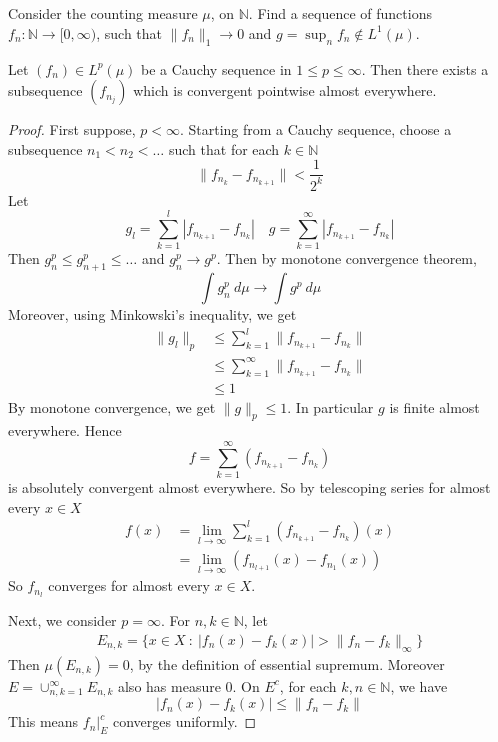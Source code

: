 
\chapter{}

\begin{remark}
  Consider the counting measure $\mu$, on $\mathbb{N}$. Find a
  sequence of functions $f_n : \mathbb{N} \to [0, \infty)$, such that
  $\|f_n\|_1 \to 0$ and $g = \sup_{n} f_n \notin L^1(\mu)$.
\end{remark}

\begin{lemma}
  Let $(f_n) \in L^p( \mu)$ be a Cauchy sequence in $1 \le p \le
  \infty$. Then there exists a subsequence $(f_{n_j})$ which is convergent
  pointwise almost everywhere.
\end{lemma}
\begin{proof}
  First suppose, $p < \infty$. Starting from a Cauchy sequence,
  choose a subsequence $n_1 < n_2 < \ldots$ such that for each $ k
  \in \mathbb{N}$ \[
    \|f_{n_k} - f_{n_{k+1}}\| < \frac{1}{2^k}
  \]
  Let \[
    g_l = \sum_{k = 1}^{l} |f_{n_{k+1}} - f_{n_k}| \quad g = \sum_{k
    = 1}^{\infty} |f_{n_{k+1}} - f_{n_k}|
  \]
  Then $g_n^p \le g_{n+1}^p \le \ldots$ and $g_n^p \to g^p$. Then by
  monotone convergence theorem, \[
    \int g_n^p \ d \mu \to \int g^p \ d \mu
  \]
  Moreover, using Minkowski's inequality, we get
  \begin{align*}
    \|g_l\|_p &\le \sum_{k = 1}^{l} \|f_{n_{k+1}} - f_{n_k}\| \\
    &\le \sum_{k = 1}^{\infty}  \|f_{n_{k+1}} - f_{n_k}\| \\
    &\le 1
  \end{align*}
  By monotone convergence, we get $\|g\|_p \le 1$. In particular $g$
  is finite almost everywhere. Hence \[
    f = \sum_{k = 1}^{\infty} (f_{n_{k+1}} - f_{n_k})
  \]
  is absolutely convergent almost everywhere. So by telescoping
  series for almost every $x \in X$
  \begin{align*}
    f(x) &= \lim_{l \to \infty} \sum_{k = 1}^{l} (f_{n_{k+1}} - f_{  n_k})(x) \\
    &= \lim_{ l \to \infty} (f_{n_{l+1}}(x) - f_{n_1}(x))
  \end{align*}
  So $f_{n_l}$ converges for almost every $x \in X$.

  Next, we consider $p = \infty$.  For $n, k \in \mathbb{N}$, let
  \begin{align*}
    E_{n, k} = \{ x \in X  \ : \  |f_n(x) - f_k(x)|> \|f_n - f_k\|_\infty \}
  \end{align*}
  Then $\mu(E_{n, k}) = 0$, by the definition of essential supremum.
  Moreover $E = \cup_{n, k = 1}^{\infty} E_{n, k}$ also has measure $0$.
  On $E^c$, for each $k , n \in \mathbb{N}$, we have \[
    |f_n(x) - f_k(x)| \le \| f_n - f_k\|
  \]
  This means $f_n|_E^c$ converges uniformly.
\end{proof}

